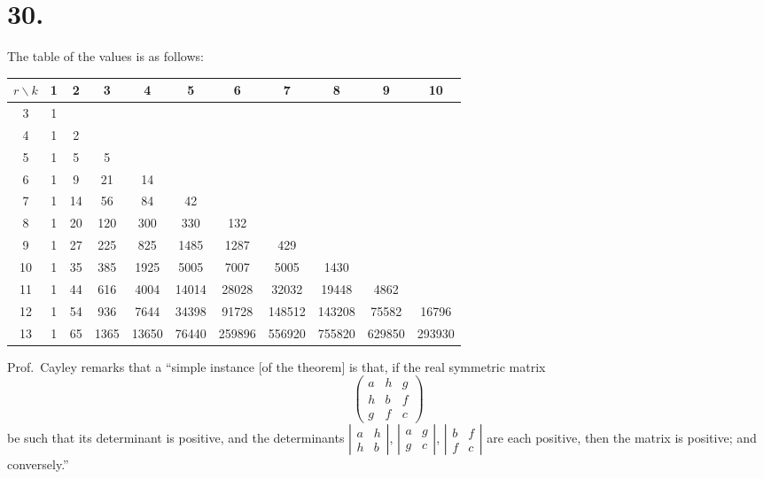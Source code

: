 \documentclass[11pt,a4paper]{book}
\begin{document}
\section*{30.}
The table of the values is as follows:

\begin{center}
\small
\begin{tabular}{c|cccccccccc}
$r \backslash k$ & 1 & 2 & 3 & 4 & 5 & 6 & 7 & 8 & 9 & 10 \\
\hline
3 & 1 \\
4 & 1 & 2 \\
5 & 1 & 5 & 5 \\
6 & 1 & 9 & 21 & 14 \\
7 & 1 & 14 & 56 & 84 & 42 \\
8 & 1 & 20 & 120 & 300 & 330 & 132 \\
9 & 1 & 27 & 225 & 825 & 1485 & 1287 & 429 \\
10 & 1 & 35 & 385 & 1925 & 5005 & 7007 & 5005 & 1430 \\
11 & 1 & 44 & 616 & 4004 & 14014 & 28028 & 32032 & 19448 & 4862 \\
12 & 1 & 54 & 936 & 7644 & 34398 & 91728 & 148512 & 143208 & 75582 & 16796 \\
13 & 1 & 65 & 1365 & 13650 & 76440 & 259896 & 556920 & 755820 & 629850 & 293930 \\
\end{tabular}
\end{center}

\newpage
{}

Prof.~Cayley remarks that a ``simple instance [of the theorem] is that, if the real symmetric matrix
\[
\begin{pmatrix}
a & h & g \\
h & b & f \\
g & f & c
\end{pmatrix}
\]
be such that its determinant is positive, and the determinants $|\begin{smallmatrix} a & h \\ h & b \end{smallmatrix}|$, $|\begin{smallmatrix} a & g \\ g & c \end{smallmatrix}|$, $|\begin{smallmatrix} b & f \\ f & c \end{smallmatrix}|$ are each positive, then the matrix is positive; and conversely.''
\end{document}
